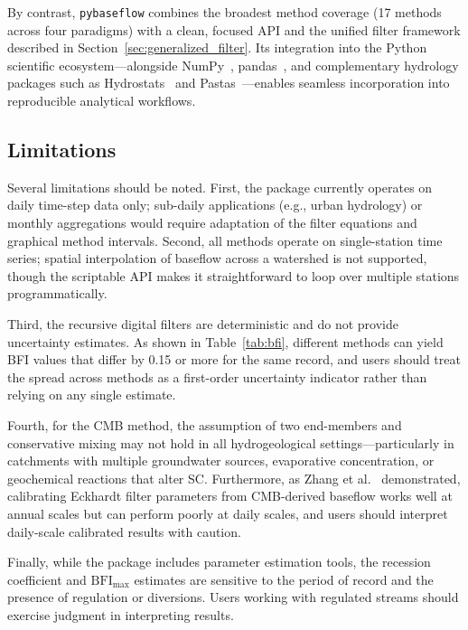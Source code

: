 \documentclass[hydrology,article,submit,pdftex,moreauthors]{Definitions/mdpi}
\begin{document}
By contrast, \texttt{pybaseflow} combines the broadest method coverage (17 methods across four paradigms) with a clean, focused API and the unified filter framework described in Section~\ref{sec:generalized_filter}. Its integration into the Python scientific ecosystem---alongside NumPy~\cite{Harris2020}, pandas~\cite{McKinney2010}, and complementary hydrology packages such as Hydrostats~\cite{Roberts2018} and Pastas~\cite{Collenteur2019}---enables seamless incorporation into reproducible analytical workflows.

\subsection{Limitations}
\label{sec:limitations}

Several limitations should be noted. First, the package currently operates on daily time-step data only; sub-daily applications (e.g., urban hydrology) or monthly aggregations would require adaptation of the filter equations and graphical method intervals. Second, all methods operate on single-station time series; spatial interpolation of baseflow across a watershed is not supported, though the scriptable API makes it straightforward to loop over multiple stations programmatically.

Third, the recursive digital filters are deterministic and do not provide uncertainty estimates. As shown in Table~\ref{tab:bfi}, different methods can yield BFI values that differ by 0.15 or more for the same record, and users should treat the spread across methods as a first-order uncertainty indicator rather than relying on any single estimate.

Fourth, for the CMB method, the assumption of two end-members and conservative mixing may not hold in all hydrogeological settings---particularly in catchments with multiple groundwater sources, evaporative concentration, or geochemical reactions that alter SC. Furthermore, as Zhang et al.~\cite{Zhang2021} demonstrated, calibrating Eckhardt filter parameters from CMB-derived baseflow works well at annual scales but can perform poorly at daily scales, and users should interpret daily-scale calibrated results with caution.

Finally, while the package includes parameter estimation tools, the recession coefficient and $\mathrm{BFI_{max}}$ estimates are sensitive to the period of record and the presence of regulation or diversions. Users working with regulated streams should exercise judgment in interpreting results.
\end{document}
